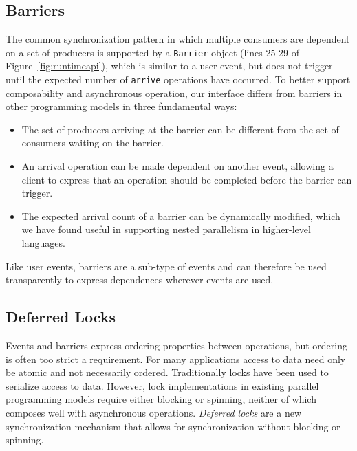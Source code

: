 \subsection{Barriers}
\label{subsec:barriers}
The common synchronization pattern in which multiple consumers are dependent on
a set of producers is supported by a {\tt Barrier} object (lines 25-29 of Figure~\ref{fig:runtimeapi}), which is similar
to a user event, but does not trigger until the expected number of {\tt arrive}
operations have occurred.  To better support
composability and asynchronous operation, our interface differs from barriers in other programming
models\cite{MPI} in three fundamental ways:
\begin{itemize} \itemsep1pt \parskip0pt 
\item The set of producers arriving at the barrier can be different from the set of consumers waiting on the barrier.
\item An arrival operation can be made dependent on another event, allowing a client to
express that an operation should be completed before the barrier can trigger.
\item The expected arrival count of a barrier can be dynamically modified, which we
have found useful in supporting nested parallelism in higher-level languages.
\end{itemize}

Like user events, barriers are a sub-type of events and can therefore
be used transparently to express dependences wherever events are used.

\subsection{Deferred Locks}
\label{subsec:locks}

Events and barriers express ordering properties between operations, but 
ordering is often too strict a requirement.  For many applications access to data need only be atomic and
not necessarily ordered.  Traditionally locks have been used to serialize access to
data.  However, lock implementations in existing parallel programming models require either blocking
or spinning, neither of which composes well with asynchronous operations.
{\em Deferred locks} are a new synchronization mechanism that allows for synchronization
without blocking or spinning.

